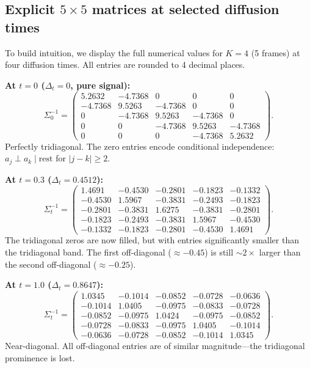 \documentclass[11pt,a4paper]{article}
\newcommand{\Dt}{\Delta_t}
\begin{document}
\subsection{Explicit $5 \times 5$ matrices at selected diffusion times}

To build intuition, we display the full numerical values for $K = 4$ (5 frames) at four diffusion times.  All entries are rounded to 4 decimal places.

\medskip
\noindent\textbf{At $t = 0$ ($\Dt = 0$, pure signal):}
\begin{equation}\label{eq:numerical-t0}
\Sigma_0^{-1} = \begin{pmatrix}
5.2632 & -4.7368 & 0 & 0 & 0 \\
-4.7368 & 9.5263 & -4.7368 & 0 & 0 \\
0 & -4.7368 & 9.5263 & -4.7368 & 0 \\
0 & 0 & -4.7368 & 9.5263 & -4.7368 \\
0 & 0 & 0 & -4.7368 & 5.2632
\end{pmatrix}.
\end{equation}
Perfectly tridiagonal.  The zero entries encode conditional independence: $a_j \perp a_k \mid \text{rest}$ for $|j-k| \geq 2$.

\medskip
\noindent\textbf{At $t = 0.3$ ($\Dt = 0.4512$):}
\begin{equation}\label{eq:numerical-t03}
\Sigma_t^{-1} = \begin{pmatrix}
1.4691 & -0.4530 & -0.2801 & -0.1823 & -0.1332 \\
-0.4530 & 1.5967 & -0.3831 & -0.2493 & -0.1823 \\
-0.2801 & -0.3831 & 1.6275 & -0.3831 & -0.2801 \\
-0.1823 & -0.2493 & -0.3831 & 1.5967 & -0.4530 \\
-0.1332 & -0.1823 & -0.2801 & -0.4530 & 1.4691
\end{pmatrix}.
\end{equation}
The tridiagonal zeros are now filled, but with entries significantly smaller than the tridiagonal band.  The first off-diagonal ($\approx -0.45$) is still $\sim 2\times$ larger than the second off-diagonal ($\approx -0.25$).

\medskip
\noindent\textbf{At $t = 1.0$ ($\Dt = 0.8647$):}
\begin{equation}\label{eq:numerical-t10}
\Sigma_t^{-1} = \begin{pmatrix}
1.0345 & -0.1014 & -0.0852 & -0.0728 & -0.0636 \\
-0.1014 & 1.0405 & -0.0975 & -0.0833 & -0.0728 \\
-0.0852 & -0.0975 & 1.0424 & -0.0975 & -0.0852 \\
-0.0728 & -0.0833 & -0.0975 & 1.0405 & -0.1014 \\
-0.0636 & -0.0728 & -0.0852 & -0.1014 & 1.0345
\end{pmatrix}.
\end{equation}
Near-diagonal.  All off-diagonal entries are of similar magnitude---the tridiagonal prominence is lost.
\end{document}
